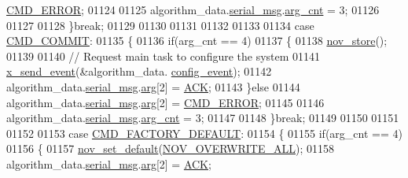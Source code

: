 \begin{DoxyCode}
{{{{{      \hyperlink{a00021_a1764a522e9c1a59a59be8757c69fa494}{CMD\_ERROR};
01124 
01125                              algorithm\_data.\hyperlink{a00016_afcf5f557aea688aad985eec15269c1da}{serial\_msg}.\hyperlink{a00031_a7b79f40e2eeec288091afd340bf8f591}{arg\_cnt} = 3;
01126                             
01127 
01128                 \}\textcolor{keywordflow}{break};
01129 
01130 
01131 
01132 
01133 
01134                  \textcolor{keywordflow}{case} \hyperlink{a00021_a7df85bf97a6a032220d7a71c78be5206}{CMD\_COMMIT}:
01135                 \{
01136                          \textcolor{keywordflow}{if}(arg\_cnt == 4)
01137                          \{
01138                              \hyperlink{a00029_a90aef186f45a15d94bf0247122194991}{nov\_store}();
01139                            
01140                         \textcolor{comment}{// Request main task to configure the system}
01141                              \hyperlink{a00036_a4bc3d03c8d62c8237329ed4e969fbc1b}{x\_send\_event}(&algorithm\_data.
      \hyperlink{a00016_a461881ff0583945fd26ee6d5faf8ce1b}{config\_event});
01142                              algorithm\_data.\hyperlink{a00016_afcf5f557aea688aad985eec15269c1da}{serial\_msg}.\hyperlink{a00031_af7d6f762438c80072bd9dc0e4dd4ae1e}{arg}[2] = \hyperlink{a00021_a6f6489887e08bff4887d0bc5dcf214d8}{ACK};
01143                          \}\textcolor{keywordflow}{else}
01144                              algorithm\_data.\hyperlink{a00016_afcf5f557aea688aad985eec15269c1da}{serial\_msg}.\hyperlink{a00031_af7d6f762438c80072bd9dc0e4dd4ae1e}{arg}[2] = 
      \hyperlink{a00021_a1764a522e9c1a59a59be8757c69fa494}{CMD\_ERROR};
01145 
01146                              algorithm\_data.\hyperlink{a00016_afcf5f557aea688aad985eec15269c1da}{serial\_msg}.\hyperlink{a00031_a7b79f40e2eeec288091afd340bf8f591}{arg\_cnt} = 3;
01147 
01148                 \}\textcolor{keywordflow}{break};
01149 
01150 
01151 
01152 
01153                 \textcolor{keywordflow}{case} \hyperlink{a00021_a8ad7dae51114833acbb665d703d8ffeb}{CMD\_FACTORY\_DEFAULT}:
01154                 \{
01155                          \textcolor{keywordflow}{if}(arg\_cnt == 4)
01156                          \{
01157                             \hyperlink{a00029_ada4ee53cb163a9ed3e2b4a5c7192690a}{nov\_set\_default}(\hyperlink{a00029_aa3471d8e4814035dc24211c0890899bb}{NOV\_OVERWRITE\_ALL});
01158                              algorithm\_data.\hyperlink{a00016_afcf5f557aea688aad985eec15269c1da}{serial\_msg}.\hyperlink{a00031_af7d6f762438c80072bd9dc0e4dd4ae1e}{arg}[2] = \hyperlink{a00021_a6f6489887e08bff4887d0bc5dcf214d8}{ACK};
}}}}}
\end{DoxyCode}

